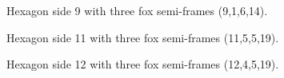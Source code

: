 \documentclass[11pt]{article}
\begin{document}
\begin{figure}[h!]
\centering
{}
\caption{Hexagon side 9 with three fox semi-frames (9,1,6,14).}
\end{figure}

\begin{figure}[h!]
\centering
{}
\caption{Hexagon side 11 with three fox semi-frames (11,5,5,19).}
\end{figure}

\begin{figure}[h!]
\centering
{}
\caption{Hexagon side 12 with three fox semi-frames (12,4,5,19).}
\end{figure}
\end{document}
